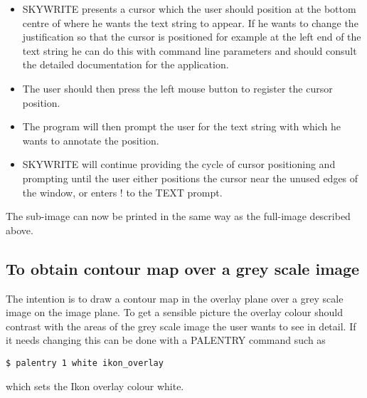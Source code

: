 \documentclass[twoside,11pt]{article}
\begin{document}
\begin{itemize}
\item SKYWRITE presents a cursor which the user should position at the bottom
centre of where he wants the text string to appear. If he wants to change the
justification so that the cursor is positioned for example at the left end of
the text string he can do this with command line parameters and should consult
the detailed documentation for the application.
\item The user should then press the left mouse button to register the cursor
position.
\item The program will then prompt the user for the text string with which he
wants to annotate the position.
\item SKYWRITE will continue providing the cycle of cursor positioning and
prompting until the user either positions the cursor near the unused edges of
the window, or enters ! to the TEXT prompt.
\end{itemize}

The sub-image can now be printed in the same way as the full-image described
above.
\subsection{To obtain contour map over a grey scale image}
\label{k:contgrey}
The intention is to draw a contour map in the overlay plane over a grey scale
image on the image plane. To get a sensible picture the overlay colour should
contrast with the areas of the grey scale image the user wants to see in detail.
If it needs changing this can be done with a PALENTRY command such as
\begin{small}
\begin{verbatim}
$ palentry 1 white ikon_overlay
\end{verbatim}
\end{small}
which sets the Ikon overlay colour white.
\end{document}
